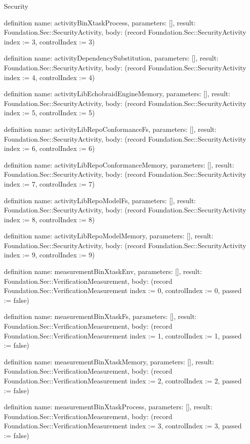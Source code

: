 \begin{lexlean}{Security}
\begin{semanticmodule}
definition{
  name: activityBinXtaskProcess,
  parameters: [],
  result: Foundation.Sec::SecurityActivity,
  body: (record Foundation.Sec::SecurityActivity {index := 3, controlIndex := 3})
}

definition{
  name: activityDependencySubstitution,
  parameters: [],
  result: Foundation.Sec::SecurityActivity,
  body: (record Foundation.Sec::SecurityActivity {index := 4, controlIndex := 4})
}

definition{
  name: activityLibEchobraidEngineMemory,
  parameters: [],
  result: Foundation.Sec::SecurityActivity,
  body: (record Foundation.Sec::SecurityActivity {index := 5, controlIndex := 5})
}

definition{
  name: activityLibRepoConformanceFs,
  parameters: [],
  result: Foundation.Sec::SecurityActivity,
  body: (record Foundation.Sec::SecurityActivity {index := 6, controlIndex := 6})
}

definition{
  name: activityLibRepoConformanceMemory,
  parameters: [],
  result: Foundation.Sec::SecurityActivity,
  body: (record Foundation.Sec::SecurityActivity {index := 7, controlIndex := 7})
}

definition{
  name: activityLibRepoModelFs,
  parameters: [],
  result: Foundation.Sec::SecurityActivity,
  body: (record Foundation.Sec::SecurityActivity {index := 8, controlIndex := 8})
}

definition{
  name: activityLibRepoModelMemory,
  parameters: [],
  result: Foundation.Sec::SecurityActivity,
  body: (record Foundation.Sec::SecurityActivity {index := 9, controlIndex := 9})
}

definition{
  name: measurementBinXtaskEnv,
  parameters: [],
  result: Foundation.Sec::VerificationMeasurement,
  body: (record Foundation.Sec::VerificationMeasurement {index := 0, controlIndex := 0, passed := false})
}

definition{
  name: measurementBinXtaskFs,
  parameters: [],
  result: Foundation.Sec::VerificationMeasurement,
  body: (record Foundation.Sec::VerificationMeasurement {index := 1, controlIndex := 1, passed := false})
}

definition{
  name: measurementBinXtaskMemory,
  parameters: [],
  result: Foundation.Sec::VerificationMeasurement,
  body: (record Foundation.Sec::VerificationMeasurement {index := 2, controlIndex := 2, passed := false})
}

definition{
  name: measurementBinXtaskProcess,
  parameters: [],
  result: Foundation.Sec::VerificationMeasurement,
  body: (record Foundation.Sec::VerificationMeasurement {index := 3, controlIndex := 3, passed := false})
}


\end{semanticmodule}
\end{lexlean}
